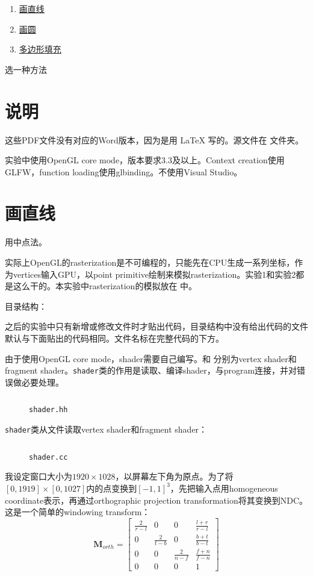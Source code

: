 \documentclass{cumtbrep}
\newcommand\inputcode[3][c++]{%
	\inputminted{#1}{#2}
	\begin{figure}[H]
		\centering
		\captionsetup{type=table}
		\caption{\texttt{#3}}
	\end{figure}
}
\begin{document}

\namesec
\begin{enumerate}
	\item \hyperref[sec:1]{画直线}
	\item \hyperref[sec:2]{画圆}
	\item \hyperref[sec:3]{多边形填充}
\end{enumerate}

\purposesec
\noindent 选一种方法

\contentsec
\section*{说明}
这些PDF文件没有对应的Word版本，因为是用 \LaTeX{} 写的。源文件在 文件夹。

实验中使用OpenGL core mode，版本要求3.3及以上。Context creation使用GLFW，function loading使用glbinding。不使用Visual Studio。

\section{画直线}\label{sec:1}
用中点法。

实际上OpenGL的rasterization是不可编程的，只能先在CPU生成一系列坐标，作为vertices输入GPU，以point primitive绘制来模拟rasterization。实验1和实验2都是这么干的。本实验中rasterization的模拟放在 中。

目录结构：{\ttfamily }

之后的实验中只有新增或修改文件时才贴出代码，目录结构中没有给出代码的文件默认与下面贴出的代码相同。文件名标在完整代码的下方。

由于使用OpenGL core mode，shader需要自己编写。和 分别为vertex shader和fragment shader。\texttt{shader}类的作用是读取、编译shader，与program连接，并对错误做必要处理。
\inputcode{../line/shader.hh}{shader.hh}

\texttt{shader}类从文件读取vertex shader和fragment shader：
\inputcode{../line/shader.cc}{shader.cc}

我设定窗口大小为$1920\times 1028$，以屏幕左下角为原点。为了将$[0,1919]\times [0,1027]$内的点变换到$[-1,1]^3$，先把输入点用homogeneous coordinate表示，再通过orthographic projection transformation将其变换到NDC。这是一个简单的windowing transform：
\[
	\mathbf{M}_{\mathit{orth}} = \begin{bmatrix}
		\frac{2}{r-l} & 0 & 0 & \frac{l+r}{r-l} \\
		0 & \frac{2}{t-b} & 0 & \frac{b+t}{b-t} \\
		0 & 0 & \frac{2}{n-f} & \frac{f+n}{f-n} \\
		0 & 0 & 0 & 1
	\end{bmatrix}
\]
\end{document}

